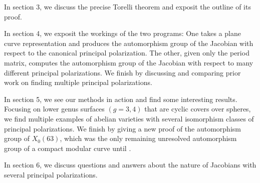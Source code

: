 \documentclass[12pt,reqno]{amsart}
\theoremstyle{definition}
\theoremstyle{remark}
\newtheorem*{remark}{Remark}
\begin{document}
In section 3, we discuss the precise Torelli theorem and exposit the outline of its proof. %

In section 4, we exposit the workings of the two programs: One takes a plane curve representation and produces the automorphism group of the Jacobian with respect to the canonical principal polarization. The other, given only the period matrix, computes the automorphism group of the Jacobian with respect to many different principal polarizations. We finish by discussing and comparing prior work on finding multiple principal polarizations.

In section 5, we see our methods in action and find some interesting results. Focusing on lower genus surfaces $(g = 3, 4)$ that are cyclic covers over spheres, we find multiple examples of abelian varieties with several isomorphism classes of principal polarizations. We finish by giving a new proof of the automorphism group of $X_0(63)$, which was the only remaining unresolved automorphism group of a compact modular curve until \cite{elkies}.  

In section 6, we discuss questions and answers about the nature of Jacobians with several principal polarizations. 









\end{document}
